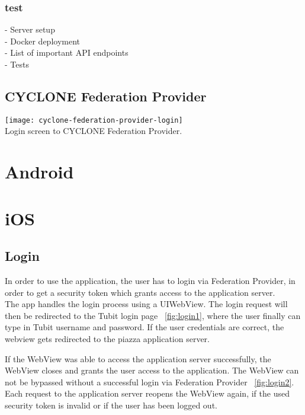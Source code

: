 \subsubsection{test}

- Server setup\\
- Docker deployment\\
- List of important API endpoints\\
- Tests

\subsection{CYCLONE Federation Provider}
\label{federation-provider}

\begin{center}
    \texttt{[image: cyclone-federation-provider-login]}\\
    Login screen to CYCLONE Federation Provider.
\end{center}


\vspace{0.5cm}

\section{Android}




\vspace{0.5cm}

\section{iOS}
\subsection{Login}

In order to use the application, the user has to login via Federation Provider, in order to get
a security token which grants access to the application server. \\

The app handles the login process using a UIWebView. The login request will then be redirected
to the Tubit login page ~\ref{fig:login1}, where the user finally can type in Tubit username and password.
If the user credentials are correct, the webview gets redirected to the piazza application server.

If the WebView was able to access the application server successfully, the WebView closes and grants the user access to the application. The WebView can not be bypassed without a successful login via Federation Provider ~\ref{fig:login2}. Each request to the application server reopens the WebView again, if the used security token is invalid or if the user has been logged out. 


